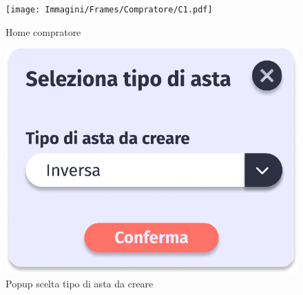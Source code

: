             \begin{figure}[!htb]
            \begin{minipage}{0.32\textwidth}
                \centering
                \texttt{[image: Immagini/Frames/Compratore/C1.pdf]}
                \caption{Home compratore}
            \end{minipage}\hfill
            \begin{minipage}{0.32\textwidth}
                \centering
                \includegraphics[width=.7\linewidth]{Immagini/Frames/Popup/P0A.pdf}
                \caption{Popup scelta tipo di asta da creare}
            \end{minipage}\hfill
            \begin{minipage}{0.32\textwidth}
                \centering

\end{minipage}
\end{figure}

